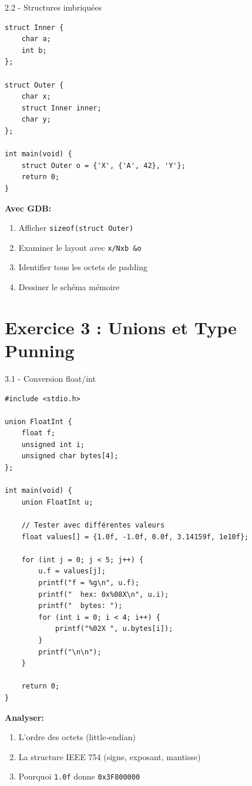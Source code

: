 \documentclass[10pt,a4paper]{article}
\begin{document}
\begin{exercicebox}{2.2 - Structures imbriquées}
\begin{lstlisting}
struct Inner {
    char a;
    int b;
};

struct Outer {
    char x;
    struct Inner inner;
    char y;
};

int main(void) {
    struct Outer o = {'X', {'A', 42}, 'Y'};
    return 0;
}
\end{lstlisting}

\textbf{Avec GDB:}
\begin{enumerate}
\item Afficher \texttt{sizeof(struct Outer)}
\item Examiner le layout avec \texttt{x/Nxb \&o}
\item Identifier tous les octets de padding
\item Dessiner le schéma mémoire
\end{enumerate}
\end{exercicebox}

\section{Exercice 3 : Unions et Type Punning}

\begin{exercicebox}{3.1 - Conversion float/int}
\begin{lstlisting}
#include <stdio.h>

union FloatInt {
    float f;
    unsigned int i;
    unsigned char bytes[4];
};

int main(void) {
    union FloatInt u;
    
    // Tester avec différentes valeurs
    float values[] = {1.0f, -1.0f, 0.0f, 3.14159f, 1e10f};
    
    for (int j = 0; j < 5; j++) {
        u.f = values[j];
        printf("f = %g\n", u.f);
        printf("  hex: 0x%08X\n", u.i);
        printf("  bytes: ");
        for (int i = 0; i < 4; i++) {
            printf("%02X ", u.bytes[i]);
        }
        printf("\n\n");
    }
    
    return 0;
}
\end{lstlisting}

\textbf{Analyser:}
\begin{enumerate}
\item L'ordre des octets (little-endian)
\item La structure IEEE 754 (signe, exposant, mantisse)
\item Pourquoi \texttt{1.0f} donne \texttt{0x3F800000}
\end{enumerate}
\end{exercicebox}
\end{document}
